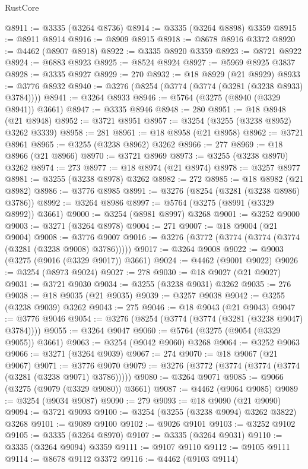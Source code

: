 \begin{lexlean}{RustCore}
\begin{coremodule}
@8911 := @3335 (@3264 @8736)
@8914 := @3335 (@3264 @8898) @3359
@8915 := @8911 @8914
@8916 := @8909 @8915
@8918 := @8678 @8916 @3372
@8920 := @4462 (@8907 @8918)
@8922 := @3335 @8920 @3359
@8923 := @8721 @8922
@8924 := @6883 @8923
@8925 := @8524 @8924
@8927 := @5969 @8925 @3837
@8928 := @3335 @8927
@8929 := 270
@8932 := @18 @8929 (@21 @8929)
@8933 := @3776 @8932
@8940 := @3276 (@8254 (@3774 (@3774 (@3281 (@3238 @8933) @3784))))
@8941 := @3264 @8933
@8946 := @5764 (@3275 (@8940 (@3329 @8941)) @3661)
@8947 := @3335 @8946
@8948 := 280
@8951 := @18 @8948 (@21 @8948)
@8952 := @3721 @8951
@8957 := @3254 (@3255 (@3238 @8952) @3262 @3339)
@8958 := 281
@8961 := @18 @8958 (@21 @8958)
@8962 := @3721 @8961
@8965 := @3255 (@3238 @8962) @3262
@8966 := 277
@8969 := @18 @8966 (@21 @8966)
@8970 := @3721 @8969
@8973 := @3255 (@3238 @8970) @3262
@8974 := 273
@8977 := @18 @8974 (@21 @8974)
@8978 := @3257 @8977
@8981 := @3255 (@3238 @8978) @3262
@8982 := 272
@8985 := @18 @8982 (@21 @8982)
@8986 := @3776 @8985
@8991 := @3276 (@8254 (@3281 (@3238 @8986) @3786))
@8992 := @3264 @8986
@8997 := @5764 (@3275 (@8991 (@3329 @8992)) @3661)
@9000 := @3254 (@8981 @8997) @3268
@9001 := @3252 @9000
@9003 := @3271 (@3264 @8978)
@9004 := 271
@9007 := @18 @9004 (@21 @9004)
@9008 := @3776 @9007
@9016 := @3276 (@3772 (@3774 (@3774 (@3774 (@3281 (@3238 @9008) @3786)))))
@9017 := @3264 @9008
@9022 := @9003 (@3275 (@9016 (@3329 @9017)) @3661)
@9024 := @4462 (@9001 @9022)
@9026 := @3254 (@8973 @9024)
@9027 := 278
@9030 := @18 @9027 (@21 @9027)
@9031 := @3721 @9030
@9034 := @3255 (@3238 @9031) @3262
@9035 := 276
@9038 := @18 @9035 (@21 @9035)
@9039 := @3257 @9038
@9042 := @3255 (@3238 @9039) @3262
@9043 := 275
@9046 := @18 @9043 (@21 @9043)
@9047 := @3776 @9046
@9054 := @3276 (@8254 (@3774 (@3774 (@3281 (@3238 @9047) @3784))))
@9055 := @3264 @9047
@9060 := @5764 (@3275 (@9054 (@3329 @9055)) @3661)
@9063 := @3254 (@9042 @9060) @3268
@9064 := @3252 @9063
@9066 := @3271 (@3264 @9039)
@9067 := 274
@9070 := @18 @9067 (@21 @9067)
@9071 := @3776 @9070
@9079 := @3276 (@3772 (@3774 (@3774 (@3774 (@3281 (@3238 @9071) @3786)))))
@9080 := @3264 @9071
@9085 := @9066 (@3275 (@9079 (@3329 @9080)) @3661)
@9087 := @4462 (@9064 @9085)
@9089 := @3254 (@9034 @9087)
@9090 := 279
@9093 := @18 @9090 (@21 @9090)
@9094 := @3721 @9093
@9100 := @3254 (@3255 (@3238 @9094) @3262 @3822) @3268
@9101 := @9089 @9100
@9102 := @9026 @9101
@9103 := @3252 @9102
@9105 := @3335 (@3264 @8970)
@9107 := @3335 (@3264 @9031)
@9110 := @3335 (@3264 @9094) @3359
@9111 := @9107 @9110
@9112 := @9105 @9111
@9114 := @8678 @9112 @3372
@9116 := @4462 (@9103 @9114)

\end{coremodule}
\end{lexlean}
